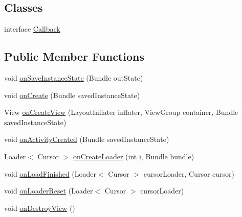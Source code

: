 \subsection*{Classes}
\begin{DoxyCompactItemize}
\item 
interface \hyperlink{interfaceorg_1_1buildmlearn_1_1videocollection_1_1fragment_1_1MainActivityFragment_1_1Callback}{Callback}
\end{DoxyCompactItemize}
\subsection*{Public Member Functions}
\begin{DoxyCompactItemize}
\item 
void \hyperlink{classorg_1_1buildmlearn_1_1videocollection_1_1fragment_1_1MainActivityFragment_a27e143375db129bbc4704152c4b83b3c}{on\+Save\+Instance\+State} (Bundle out\+State)
\item 
void \hyperlink{classorg_1_1buildmlearn_1_1videocollection_1_1fragment_1_1MainActivityFragment_a8181c07e61fef8c1d4dff28276fb7b25}{on\+Create} (Bundle saved\+Instance\+State)
\item 
View \hyperlink{classorg_1_1buildmlearn_1_1videocollection_1_1fragment_1_1MainActivityFragment_a61e7facd1ed28d88c7dc87e7eee87b0a}{on\+Create\+View} (Layout\+Inflater inflater, View\+Group container, Bundle saved\+Instance\+State)
\item 
void \hyperlink{classorg_1_1buildmlearn_1_1videocollection_1_1fragment_1_1MainActivityFragment_a8db59e2714a9b1bed29db8b19fc0dd94}{on\+Activity\+Created} (Bundle saved\+Instance\+State)
\item 
Loader$<$ Cursor $>$ \hyperlink{classorg_1_1buildmlearn_1_1videocollection_1_1fragment_1_1MainActivityFragment_a49c19f6ff6c73487d2e2498e5e6293e6}{on\+Create\+Loader} (int i, Bundle bundle)
\item 
void \hyperlink{classorg_1_1buildmlearn_1_1videocollection_1_1fragment_1_1MainActivityFragment_aaec442bc081f693adddcfa0418bfc9b7}{on\+Load\+Finished} (Loader$<$ Cursor $>$ cursor\+Loader, Cursor cursor)
\item 
void \hyperlink{classorg_1_1buildmlearn_1_1videocollection_1_1fragment_1_1MainActivityFragment_a47d8ad75e71ce21c26fa800694546468}{on\+Loader\+Reset} (Loader$<$ Cursor $>$ cursor\+Loader)
\item 
void \hyperlink{classorg_1_1buildmlearn_1_1videocollection_1_1fragment_1_1MainActivityFragment_a1967a1773eb45e4d6f2eb7c8ccc01d73}{on\+Destroy\+View} ()
\end{DoxyCompactItemize}
